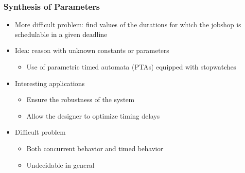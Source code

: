 \documentclass[professionalfont]{beamer}
\newcommand{\couleur}[1]{\textcolor{couleurimportante}{#1}}
\begin{document}
\begin{frame}
\frametitle{Synthesis of Parameters}

\begin{itemize}
	\item More difficult problem: \couleur{find values of the durations} for which the jobshop is schedulable in a given deadline

	\bigskip

	\item Idea: reason with unknown constants or \couleur{parameters}
	\begin{itemize}
		\item Use of \couleur{parametric timed automata} (PTAs) equipped with stopwatches
	\end{itemize}

	
	\bigskip

	\item Interesting applications
	\begin{itemize}
		\item Ensure the \couleur{robustness} of the system
		\item Allow the designer to \couleur{optimize} timing delays
	\end{itemize}

	
	\bigskip


	\item Difficult problem
	\begin{itemize}
		\item Both concurrent behavior and timed behavior
		\item Undecidable in general
	\end{itemize}

\end{itemize}

\end{frame}
\end{document}
